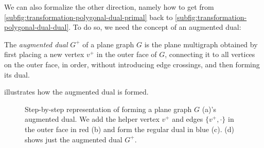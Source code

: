 We can also formalize the other direction, namely how to get from \cref{subfig:transformation-polygonal-dual-primal} back to \cref{subfig:transformation-polygonal-dual-dual}.
To do so, we need the concept of an augmented dual:
%
\begin{definition}
	The \emph{augmented dual} $G^+$ of a plane graph $G$ is the plane multigraph obtained by first placing a new vertex $v^+$ in the outer face of $G$, connecting it to all vertices on the outer face, in order, without introducing edge crossings, and then forming its dual.
	\label{def:augmented-dual}
\end{definition}

 illustrates how the augmented dual is formed.
%
\begin{figure}[H]
	\centering
	\quad
	\quad
	\quad
	\caption{Step-by-step representation of forming a plane graph $G$ (a)'s augmented dual. We add the helper vertex $v^+$ and edges $\{v^+,\cdot\}$ in the outer face in red (b) and form the regular dual in blue (c). (d) shows just the augmented dual $G^+$.}
	\label{fig:transformation-augmented-dual}
\end{figure}


